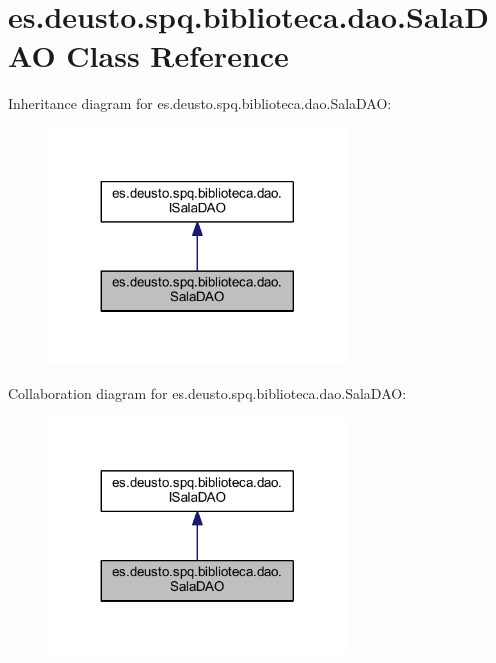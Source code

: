 \hypertarget{classes_1_1deusto_1_1spq_1_1biblioteca_1_1dao_1_1_sala_d_a_o}{}\section{es.\+deusto.\+spq.\+biblioteca.\+dao.\+Sala\+D\+AO Class Reference}
\label{classes_1_1deusto_1_1spq_1_1biblioteca_1_1dao_1_1_sala_d_a_o}


Inheritance diagram for es.\+deusto.\+spq.\+biblioteca.\+dao.\+Sala\+D\+AO\+:
\nopagebreak
\begin{figure}[H]
\begin{center}
\leavevmode
\includegraphics[width=224pt]{classes_1_1deusto_1_1spq_1_1biblioteca_1_1dao_1_1_sala_d_a_o__inherit__graph}
\end{center}
\end{figure}


Collaboration diagram for es.\+deusto.\+spq.\+biblioteca.\+dao.\+Sala\+D\+AO\+:
\nopagebreak
\begin{figure}[H]
\begin{center}
\leavevmode
\includegraphics[width=224pt]{classes_1_1deusto_1_1spq_1_1biblioteca_1_1dao_1_1_sala_d_a_o__coll__graph}
\end{center}
\end{figure}
